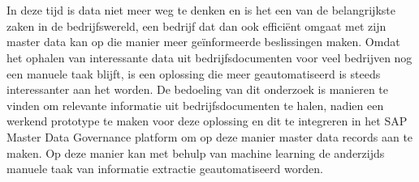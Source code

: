 
\chapter{}%
\label{ch:inleiding}



In deze tijd is data niet meer weg te denken en is het een van de belangrijkste zaken in de bedrijfswereld, een bedrijf dat dan ook efficiënt omgaat met zijn master data kan op die manier meer geïnformeerde beslissingen maken. Omdat het ophalen van interessante data uit bedrijfsdocumenten voor veel bedrijven nog een manuele taak blijft, is een oplossing die meer geautomatiseerd is steeds interessanter aan het worden. De bedoeling van dit onderzoek is manieren te vinden om relevante informatie uit bedrijfsdocumenten te halen, nadien een werkend prototype te maken voor deze oplossing en dit te integreren in het SAP Master Data Governance platform om op deze manier master data records aan te maken. Op deze manier kan met behulp van machine learning de anderzijds manuele taak van informatie extractie geautomatiseerd worden.

\section{}%
\label{sec:probleemstelling}

